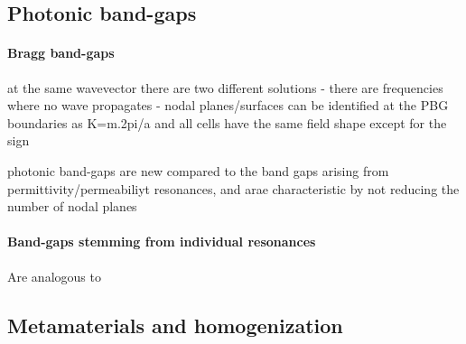 \subsection{Photonic band-gaps} %
\paragraph{Bragg band-gaps}%
at the same wavevector there are two different solutions - there are frequencies where no wave propagates - nodal planes/surfaces can be identified at the PBG boundaries as K=m.2pi/a and all cells have the same field shape except for the sign

photonic band-gaps are new compared to the band gaps arising from permittivity/permeabiliyt resonances, and arae characteristic by not reducing the number of nodal planes 




\paragraph{Band-gaps stemming from individual resonances}%
Are analogous to 
\subsection{Metamaterials and homogenization}

